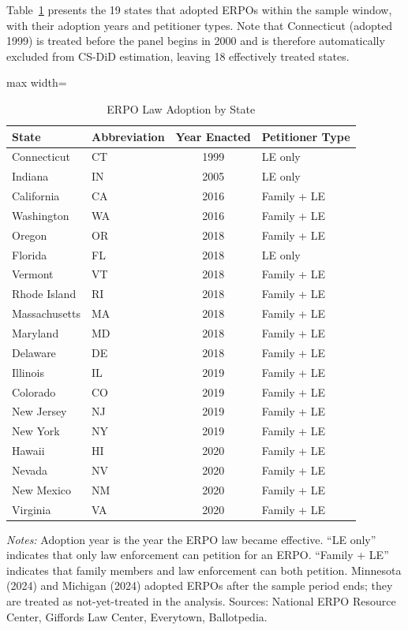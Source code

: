\documentclass[12pt]{article}
\begin{document}
Table~\ref{tab:erpo_states} presents the 19 states that adopted ERPOs within the sample window, with their adoption years and petitioner types. Note that Connecticut (adopted 1999) is treated before the panel begins in 2000 and is therefore automatically excluded from CS-DiD estimation, leaving 18 effectively treated states.

\begin{table}[H]
\centering
\caption{ERPO Law Adoption by State}
\label{tab:erpo_states}
\begin{adjustbox}{max width=\textwidth}
\begin{tabular}{llcl}
\toprule
State & Abbreviation & Year Enacted & Petitioner Type \\
\midrule
Connecticut & CT & 1999 & LE only \\
Indiana & IN & 2005 & LE only \\
California & CA & 2016 & Family + LE \\
Washington & WA & 2016 & Family + LE \\
Oregon & OR & 2018 & Family + LE \\
Florida & FL & 2018 & LE only \\
Vermont & VT & 2018 & Family + LE \\
Rhode Island & RI & 2018 & Family + LE \\
Massachusetts & MA & 2018 & Family + LE \\
Maryland & MD & 2018 & Family + LE \\
Delaware & DE & 2018 & Family + LE \\
Illinois & IL & 2019 & Family + LE \\
Colorado & CO & 2019 & Family + LE \\
New Jersey & NJ & 2019 & Family + LE \\
New York & NY & 2019 & Family + LE \\
Hawaii & HI & 2020 & Family + LE \\
Nevada & NV & 2020 & Family + LE \\
New Mexico & NM & 2020 & Family + LE \\
Virginia & VA & 2020 & Family + LE \\
\bottomrule
\end{tabular}
\end{adjustbox}
\begin{flushleft}
\small \textit{Notes:} Adoption year is the year the ERPO law became effective. ``LE only'' indicates that only law enforcement can petition for an ERPO. ``Family + LE'' indicates that family members and law enforcement can both petition. Minnesota (2024) and Michigan (2024) adopted ERPOs after the sample period ends; they are treated as not-yet-treated in the analysis. Sources: National ERPO Resource Center, Giffords Law Center, Everytown, Ballotpedia.
\end{flushleft}
\end{table}
\end{document}
